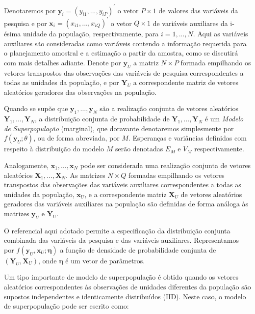 \documentclass[
  12pt,
  brazilian,
]{book}
\theoremstyle{definition}
\theoremstyle{definition}
\theoremstyle{definition}
\theoremstyle{definition}
\theoremstyle{remark}
\begin{document}
Denotaremos por \(\mathbf{y}_i=(y_{i1},...,y_{iP})^{\prime }\) o vetor \(P\times 1\)
de valores das variáveis da pesquisa e por
\(\mathbf{x}_{i}=(x_{i1},...,x_{iQ})^{\prime }\) o vetor \(Q\times 1\) de variáveis
auxiliares da i-ésima unidade da população, respectivamente, para \(i=1,...,N\).
Aqui as variáveis auxiliares são consideradas como variáveis contendo a
informação requerida para o planejamento amostral e a estimação a partir da
amostra, como se discutirá com mais detalhes adiante. Denote por
\(\mathbf{y}_{U}\) a matriz \(N \times P\) formada empilhando os vetores transpostos
das observações das variáveis de pesquisa correspondentes a todas as unidades da
população, e por \(\mathbf{Y}_{U}\) a correspondente matriz de vetores aleatórios
geradores das observações na população.

Quando se supõe que \(\mathbf{y}_1 ,\ldots, \mathbf{y}_N\) são a realização
conjunta de vetores aleatórios \(\mathbf{Y}_1 ,\ldots, \mathbf{Y}_N\), a
distribuição conjunta de probabilidade de \(\mathbf{Y}_1 ,\ldots, \mathbf{Y}_N\) é
um \emph{Modelo de Superpopulação} (marginal), que doravante denotaremos simplesmente
por \(f(\mathbf{y}_U;\theta)\), ou de forma abreviada, por \(M\). Esperanças e
variâncias definidas com respeito à distribuição do modelo \(M\) serão denotadas
\(E_M\) e \(V_M\) respectivamente.

Analogamente, \(\mathbf{x}_1 ,\ldots, \mathbf{x}_N\) pode ser considerada uma
realização conjunta de vetores aleatórios \(\mathbf{X}_1 ,\ldots, \mathbf{X}_N\).
As matrizes \(N \times Q\) formadas empilhando os vetores transpostos das
observações das variáveis auxiliares correspondentes a todas as unidades da
população, \(\mathbf{x}_{U}\), e a correspondente matriz \(\mathbf{X}_{U}\) de
vetores aleatórios geradores das variáveis auxiliares na população são definidas
de forma análoga às matrizes \(\mathbf{y}_{U}\) e \(\mathbf{Y}_{U}\).

O referencial aqui adotado permite a especificação da distribuição conjunta
combinada das variáveis da pesquisa e das variáveis auxiliares. Representamos
por \(f( \mathbf{y}_U , \mathbf{x}_U ; \mathbf{\eta} )\) a função de densidade de
probabilidade conjunta de \(( \mathbf{Y}_U , \mathbf{X}_U )\), onde
\(\mathbf{\eta}\) é um vetor de parâmetros.

Um tipo importante de modelo de superpopulação é obtido quando os vetores
aleatórios correspondentes às observações de unidades diferentes da população
são supostos independentes e identicamente distribuídos (IID). Neste caso, o
modelo de superpopulação pode ser escrito como:
\end{document}
